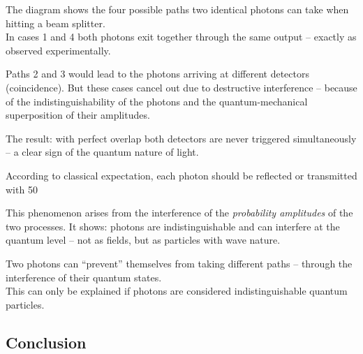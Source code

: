\begin{tcolorbox}[hinweisbox, title=What This Diagram Shows]
	\label{box:was diese Darstellun}
	\small
	The diagram shows the four possible paths two identical photons can take when hitting a beam splitter.\\
	In cases 1 and 4 both photons exit together through the same output – exactly as observed experimentally.
	
	Paths 2 and 3 would lead to the photons arriving at different detectors (coincidence). But these cases cancel out due to destructive interference – because of the indistinguishability of the photons and the quantum-mechanical superposition of their amplitudes.
	
	The result: with perfect overlap both detectors are never triggered simultaneously – a clear sign of the quantum nature of light.
\end{tcolorbox}

According to classical expectation, each photon should be reflected or transmitted with 50%

This phenomenon arises from the interference of the \emph{probability amplitudes} of the two processes. It shows: photons are indistinguishable and can interfere at the quantum level – not as fields, but as particles with wave nature.

\vspace{1em}
\begin{tcolorbox}[physikbox, title=What the HOM Effect Shows]
	\label{box:HOM-Effekt}
	\small
	Two photons can “prevent” themselves from taking different paths – through the interference of their quantum states.\\
	This can only be explained if photons are considered indistinguishable quantum particles.
\end{tcolorbox}
\newpage
\noindent
\subsection{Conclusion}

